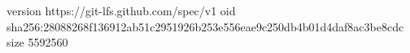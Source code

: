 version https://git-lfs.github.com/spec/v1
oid sha256:28088268f136912ab51c2951926b253e556eae9c250db4b01d4daf8ac3be8cdc
size 5592560
